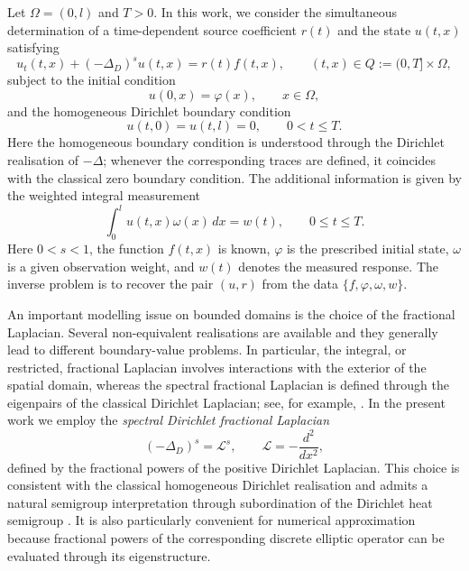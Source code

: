 \documentclass[reqno]{amsart}
\begin{document}
Let $\Omega=(0,l)$ and $T>0$. In this work, we consider the simultaneous
determination of a time-dependent source coefficient $r(t)$ and the state
$u(t,x)$ satisfying
\begin{equation}\label{1.1}
 u_t(t,x)+(-\Delta_D)^s u(t,x)=r(t)f(t,x),
 \qquad (t,x)\in Q:=(0,T]\times\Omega,
\end{equation}
subject to the initial condition
\begin{equation}\label{1.2}
 u(0,x)=\varphi(x),\qquad x\in\Omega,
\end{equation}
and the homogeneous Dirichlet boundary condition
\begin{equation}\label{1.3}
 u(t,0)=u(t,l)=0,\qquad 0<t\le T.
\end{equation}
Here the homogeneous boundary condition is understood through the Dirichlet
realisation of $-\Delta$; whenever the corresponding traces are defined, it
coincides with the classical zero boundary condition. The additional
information is given by the weighted integral measurement
\begin{equation}\label{1.4}
 \int_0^l u(t,x)\omega(x)\,dx=w(t),
 \qquad 0\le t\le T.
\end{equation}
Here $0<s<1$, the function $f(t,x)$ is known, $\varphi$ is the prescribed
initial state, $\omega$ is a given observation weight, and $w(t)$ denotes the
measured response. The inverse problem is to recover the pair $(u,r)$ from
the data $\{f,\varphi,\omega,w\}$.

An important modelling issue on bounded domains is the choice of the
fractional Laplacian. Several non-equivalent realisations are available and
they generally lead to different boundary-value problems. In particular,
the integral, or restricted, fractional Laplacian involves interactions with
the exterior of the spatial domain, whereas the spectral fractional
Laplacian is defined through the eigenpairs of the classical Dirichlet
Laplacian; see, for example, \cite{Lischke20}. In the present work we employ
the \emph{spectral Dirichlet fractional Laplacian}
\[
(-\Delta_D)^s=\mathcal L^s,
\qquad
\mathcal L=-\frac{d^2}{dx^2},
\]
defined by the fractional powers of the positive Dirichlet Laplacian. This
choice is consistent with the classical homogeneous Dirichlet realisation
and admits a natural semigroup interpretation through subordination of the
Dirichlet heat semigroup \cite{Lischke20}. It is also particularly convenient
for numerical approximation because fractional powers of the corresponding
discrete elliptic operator can be evaluated through its eigenstructure.
\end{document}
